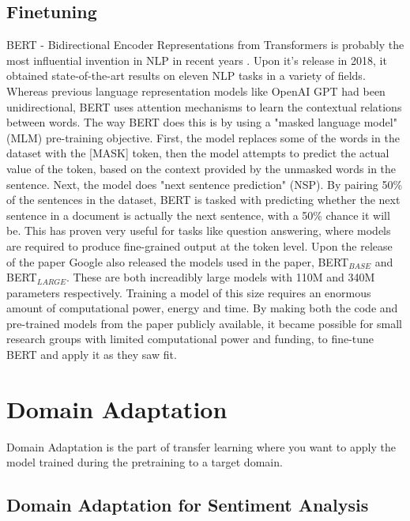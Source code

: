 \documentclass{report}
\begin{document}
\subsection{Finetuning}
BERT - Bidirectional Encoder Representations from Transformers is probably the most influential invention in NLP in recent years \cite{DBLP:journals/corr/abs-1810-04805}. Upon it's release in 2018, it obtained state-of-the-art results on eleven NLP tasks in a variety of fields. Whereas previous language representation models like OpenAI GPT had been unidirectional, BERT uses attention mechanisms to learn the contextual relations between words. The way BERT does this is by using a "masked language model" (MLM) pre-training objective. First, the model replaces some of the words in the dataset with the [MASK] token, then the model attempts to predict the actual value of the token, based on the context provided by the unmasked words in the sentence. Next, the model does "next sentence prediction" (NSP). By pairing 50\% of the sentences in the dataset, BERT is tasked with predicting whether the next sentence in a document is actually the next sentence, with a 50\% chance it will be. This has proven very useful for tasks like question answering, where models are required to produce fine-grained output at the token level. Upon the release of the paper Google also released the models used in the paper, BERT$_{BASE}$ and BERT$_{LARGE}$. These are both increadibly large models with 110M and 340M parameters respectively. Training a model of this size requires an enormous amount of computational power, energy and time. By making both the code and pre-trained models from the paper publicly available, it became possible for small research groups with limited computational power and funding, to fine-tune BERT and apply it as they saw fit.
\section{Domain Adaptation}
Domain Adaptation is the part of transfer learning where you want to apply the model trained during the pretraining to a target domain.
\subsection{Domain Adaptation for Sentiment Analysis}



\newpage


\end{document}
